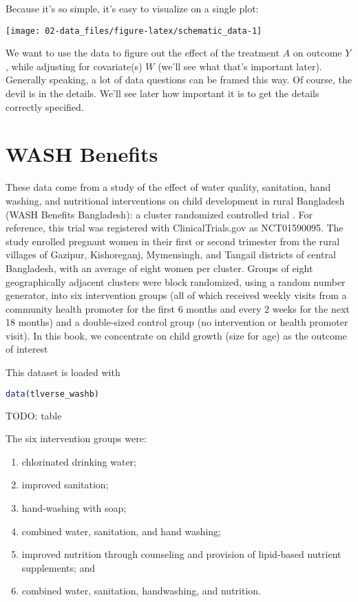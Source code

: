 \documentclass[
  12pt, krantz2,
]{krantz}
\providecommand{\tightlist}{%
  \setlength{\itemsep}{0pt}\setlength{\parskip}{0pt}}
\theoremstyle{definition}
\theoremstyle{definition}
\theoremstyle{definition}
\newcommand{\1}{\mathbbm{1}}
\begin{document}
Because it's so simple, it's easy to visualize on a single plot:

\begin{center}\texttt{[image: 02-data\_files/figure-latex/schematic\_data-1]} \end{center}

We want to use the data to figure out the effect of the treatment \(A\) on outcome \(Y\), while adjusting for covariate(s) \(W\) (we'll see what that's important later). Generally speaking, a lot of data questions can be framed this way. Of course, the devil is in the details. We'll see later how important it is to get the details correctly specified.

\hypertarget{data-washb}{%
\section{WASH Benefits}\label{data-washb}}

These data come from a study of the effect of water quality, sanitation, hand washing, and nutritional interventions on child development in rural Bangladesh (WASH Benefits Bangladesh): a cluster randomized controlled trial \citep{luby2018effect}. For reference, this trial was registered with ClinicalTrials.gov as NCT01590095. The study enrolled pregnant women in their first or second trimester from the rural villages of Gazipur, Kishoreganj, Mymensingh, and Tangail districts of central Bangladesh, with an average of eight women per cluster. Groups of eight geographically adjacent clusters were block randomized, using a random number generator, into six intervention groups (all of which received weekly visits from a community health promoter for the first 6 months and every 2 weeks for the next 18 months) and a double-sized control group (no intervention or health promoter visit). In this book, we concentrate on child growth (size for age) as the outcome of interest

This dataset is loaded with

\begin{lstlisting}[language=R]
data(tlverse_washb)
\end{lstlisting}

TODO: table

The six intervention groups were:

\begin{enumerate}
\def\labelenumi{\arabic{enumi}.}
\tightlist
\item
  chlorinated drinking water;
\item
  improved sanitation;
\item
  hand-washing with soap;
\item
  combined water, sanitation, and hand washing;
\item
  improved nutrition through counseling and provision of lipid-based nutrient supplements; and
\item
  combined water, sanitation, handwashing, and nutrition.
\end{enumerate}
\end{document}
